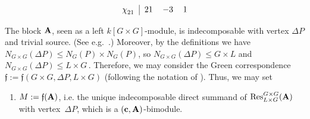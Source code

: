 \begin{nota}
\begin{enumerate}[label=(\arabic*),start=10]
\[\begin{tabular}{c|ccc}
            $\chi^{}_{21}$ & $21$ & $-3$ & $1$\\
        \end{tabular}
        \]
\end{enumerate} 
 The block ${\mathbf{A}}$, seen as a left $k[G\times G]$-module, is indecomposable with vertex $\Delta P$ and trivial source. (See e.g.~\cite[Chap. 5, Theorem~10.8]{NagaoTsushimaBook}.) Moreover, by the definitions we have $N_{G\times G}(\Delta P)\leq N_G(P)\times N_G(P)$, so 
    \(
        N_{G\times G}(\Delta P)\leq G\times L
    \)    
        and
    \(  
    N_{G\times G}(\Delta P)\leq L\times G
    \)\,.
    Therefore, we may consider the Green correspondence $\mathfrak{f}:=\mathfrak{f}(G\times G,\Delta P,L\times G)$ (following the notation of \cite[Chap. 4, \S4]{NagaoTsushimaBook}). Thus, we may set 
\begin{enumerate}[label=(\arabic*),start=12]
    \item\label{nota:3A7_candidate_bimodule} $M:=\mathfrak{f}({\mathbf{A}})$, i.e. the unique indecomposable direct summand of $\operatorname{Res}^{G\times G}_{L\times G}({\mathbf{A}})$ with vertex~$\Delta P$, which is a $({\mathbf{c}},{\mathbf{A}})$-bimodule.
\end{enumerate}   
\end{nota}

\vspace{2mm}
